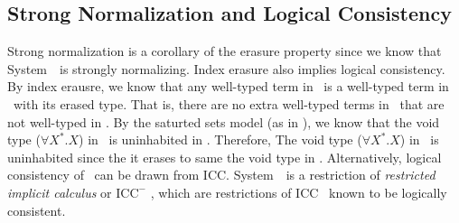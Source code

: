 \subsection{Strong Normalization and Logical Consistency} \label{ssec:sn}
Strong normalization is a corollary of the erasure property
since we know that System~\Fw\ is strongly normalizing.
Index erasure also implies logical consistency. By index erausre,
we know that any well-typed term in \Fi\ is a well-typed term in \Fw\ with
its erased type. That is, there are no extra well-typed terms in \Fi\ that
are not well-typed in \Fw. By the saturted sets model (as in \cite{AbeMat04}),
we know that the void type ($\forall X^{*}.X$) in \Fw\ is uninhabited in \Fw.
Therefore, The void type ($\forall X^{*}.X$) in \Fi\ is uninhabited since
the it erases to same the void type in \Fw.
Alternatively, logical consistency of \Fi\ can be drawn from ICC.
System~\Fi\ is a restriction of \emph{restricted implicit calculus}
\cite{Miquel00} or $\text{ICC}^{-}$ \cite{BarrasB08}, which are
restrictions of ICC~\cite{Miquel01} known to be logically consistent.

